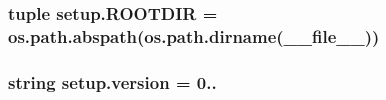 \subsubsection[{R\+O\+O\+T\+D\+I\+R}]{\setlength{\rightskip}{0pt plus 5cm}tuple setup.\+R\+O\+O\+T\+D\+I\+R = os.\+path.\+abspath(os.\+path.\+dirname(\+\_\+\+\_\+file\+\_\+\+\_\+))}\label{namespacesetup_a62a0bb453fa5e76f22937f922ab4ad95}
\hypertarget{namespacesetup_ab177531e7a80674a3db3de2d79eb8be7}{}
\subsubsection[{version}]{\setlength{\rightskip}{0pt plus 5cm}string setup.\+version = \textquotesingle{}0..\textquotesingle{}}\label{namespacesetup_ab177531e7a80674a3db3de2d79eb8be7}
